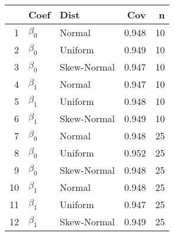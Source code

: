 \begin{table}[ht]
\centering
\begin{tabular}{rllrr}
  \hline
 & Coef & Dist & Cov & n \\ 
  \hline
1 & $\beta_0$ & Normal & 0.948 & 10 \\ 
  2 & $\beta_0$ & Uniform & 0.949 & 10 \\ 
  3 & $\beta_0$ & Skew-Normal & 0.947 & 10 \\ 
  4 & $\beta_1$ & Normal & 0.947 & 10 \\ 
  5 & $\beta_1$ & Uniform & 0.948 & 10 \\ 
  6 & $\beta_1$ & Skew-Normal & 0.949 & 10 \\ 
  7 & $\beta_0$ & Normal & 0.948 & 25 \\ 
  8 & $\beta_0$ & Uniform & 0.952 & 25 \\ 
  9 & $\beta_0$ & Skew-Normal & 0.948 & 25 \\ 
  10 & $\beta_1$ & Normal & 0.948 & 25 \\ 
  11 & $\beta_1$ & Uniform & 0.947 & 25 \\ 
  12 & $\beta_1$ & Skew-Normal & 0.949 & 25 \\ 
   \hline
\end{tabular}
\end{table}
